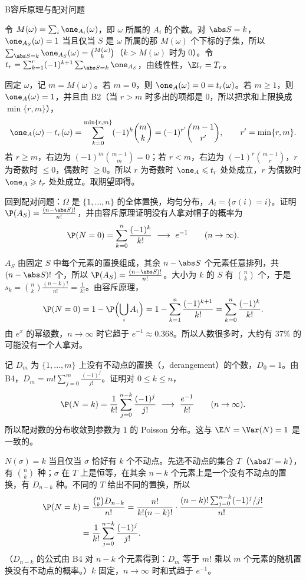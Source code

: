 \begin{probleme}{B}{容斥原理与配对问题}
\begin{questions}
\begin{solution}
令 $M(\omega)=\sum_i\one_{A_i}(\omega)$，即 $\omega$ 所属的 $A_i$ 的个数。对 $\abs S=k$，$\one_{A_S}(\omega)=1$ 当且仅当 $S$ 是 $\omega$ 所属的那 $M(\omega)$ 个下标的子集，所以 $\sum_{\abs S=k}\one_{A_S}(\omega)=\binom{M(\omega)}k$（$k>M(\omega)$ 时为 $0$）。令 $t_r=\sum_{k=1}^r(-1)^{k+1}\sum_{\abs S=k}\one_{A_S}$，由线性性，$\E t_r=T_r$。

固定 $\omega$，记 $m=M(\omega)$。若 $m=0$，则 $\one_A(\omega)=0=t_r(\omega)$。若 $m\geqslant1$，则 $\one_A(\omega)=1$，并且由 B2（当 $r>m$ 时多出的项都是 $0$，所以把求和上限换成 $\min\{r,m\}$），
\[
\one_A(\omega)-t_r(\omega)=\sum_{k=0}^{\min\{r,m\}}(-1)^k\binom mk=(-1)^{r'}\binom{m-1}{r'},\qquad r'=\min\{r,m\}.
\]
若 $r\geqslant m$，右边为 $(-1)^m\binom{m-1}m=0$；若 $r<m$，右边为 $(-1)^r\binom{m-1}r$，$r$ 为奇数时 $\leqslant0$，偶数时 $\geqslant0$。所以 $r$ 为奇数时 $\one_A\leqslant t_r$ 处处成立，$r$ 为偶数时 $\one_A\geqslant t_r$ 处处成立。取期望即得。
\end{solution}

\item 回到配对问题：$\Omega$ 是 $\{1,\dots,n\}$ 的全体置换，均匀分布，$A_i=\{\sigma(i)=i\}$。证明 $\P(A_S)=\frac{(n-\abs S)!}{n!}$，并由容斥原理证明没有人拿对帽子的概率为
\[
\P(N=0)=\sum_{k=0}^n\frac{(-1)^k}{k!}\ \longrightarrow\ e^{-1}\qquad(n\to\infty).
\]
\begin{solution}
$A_S$ 由固定 $S$ 中每个元素的置换组成，其余 $n-\abs S$ 个元素任意排列，共 $(n-\abs S)!$ 个，所以 $\P(A_S)=\frac{(n-\abs S)!}{n!}$。大小为 $k$ 的 $S$ 有 $\binom nk$ 个，于是 $s_k=\binom nk\frac{(n-k)!}{n!}=\frac1{k!}$。由容斥原理，
\[
\P(N=0)=1-\P\Bigl(\bigcup_iA_i\Bigr)=1-\sum_{k=1}^n\frac{(-1)^{k+1}}{k!}=\sum_{k=0}^n\frac{(-1)^k}{k!}.
\]
由 $e^x$ 的幂级数，$n\to\infty$ 时它趋于 $e^{-1}\approx0.368$。所以人数很多时，大约有 $37\%$ 的可能没有一个人拿对。
\end{solution}

\item 记 $D_m$ 为 $\{1,\dots,m\}$ 上没有不动点的置换（，derangement）的个数，$D_0=1$。由 B4，$D_m=m!\sum_{j=0}^m\frac{(-1)^j}{j!}$。证明对 $0\leqslant k\leqslant n$，
\[
\P(N=k)=\frac1{k!}\sum_{j=0}^{n-k}\frac{(-1)^j}{j!}\ \longrightarrow\ \frac{e^{-1}}{k!}\qquad(n\to\infty).
\]
所以配对数的分布收敛到参数为 $1$ 的 Poisson 分布。这与 $\E N=\Var(N)=1$ 是一致的。
\begin{solution}
$N(\sigma)=k$ 当且仅当 $\sigma$ 恰好有 $k$ 个不动点。先选不动点的集合 $T$（$\abs T=k$），有 $\binom nk$ 种；$\sigma$ 在 $T$ 上是恒等，在其余 $n-k$ 个元素上是一个没有不动点的置换，有 $D_{n-k}$ 种。不同的 $T$ 给出不同的置换，所以
\[
\begin{aligned}
\P(N=k)&=\frac{\binom nkD_{n-k}}{n!}=\frac{n!}{k!(n-k)!}\cdot\frac{(n-k)!\sum_{j=0}^{n-k}(-1)^j/j!}{n!}\\
&=\frac1{k!}\sum_{j=0}^{n-k}\frac{(-1)^j}{j!}.
\end{aligned}
\]
（$D_{n-k}$ 的公式由 B4 对 $n-k$ 个元素得到：$D_m$ 等于 $m!$ 乘以 $m$ 个元素的随机置换没有不动点的概率。）$k$ 固定，$n\to\infty$ 时和式趋于 $e^{-1}$。
\end{solution}
\end{questions}
\end{probleme}

